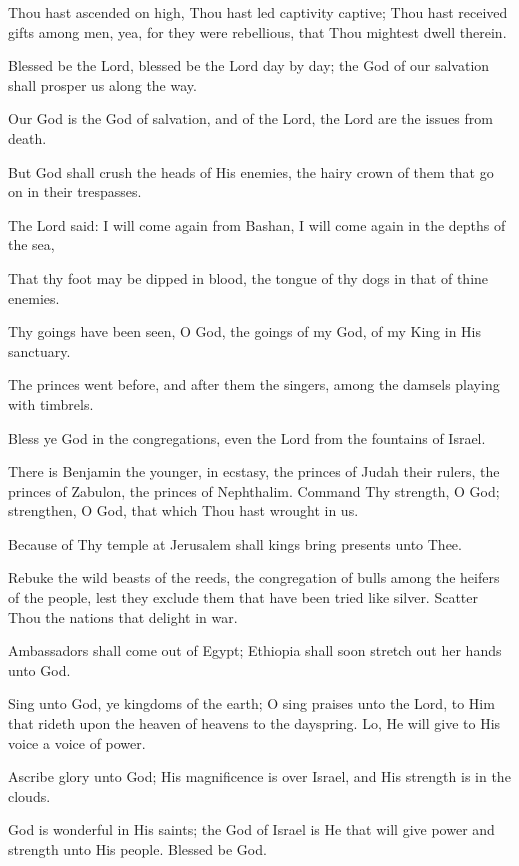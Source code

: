 Thou hast ascended on high, Thou hast led captivity captive; Thou hast received gifts among men, yea, for they were rebellious, that Thou mightest dwell therein.

Blessed be the Lord, blessed be the Lord day by day; the God of our salvation shall prosper us along the way.

Our God is the God of salvation, and of the Lord, the Lord are the issues from death.

But God shall crush the heads of His enemies, the hairy crown of them that go on in their trespasses.

The Lord said: I will come again from Bashan, I will come again in the depths of the sea,

That thy foot may be dipped in blood, the tongue of thy dogs in that of thine enemies.

Thy goings have been seen, O God, the goings of my God, of my King in His sanctuary.

The princes went before, and after them the singers, among the damsels playing with timbrels.

Bless ye God in the congregations, even the Lord from the fountains of Israel.

There is Benjamin the younger, in ecstasy, the princes of Judah their rulers, the princes of Zabulon, the princes of Nephthalim. Command Thy strength, O God; strengthen, O God, that which Thou hast wrought in us.

Because of Thy temple at Jerusalem shall kings bring presents unto Thee.

Rebuke the wild beasts of the reeds, the congregation of bulls among the heifers of the people, lest they exclude them that have been tried like silver. Scatter Thou the nations that delight in war.

Ambassadors shall come out of Egypt; Ethiopia shall soon stretch out her hands unto God.

Sing unto God, ye kingdoms of the earth; O sing praises unto the Lord, to Him that rideth upon the heaven of heavens to the dayspring. Lo, He will give to His voice a voice of power.

Ascribe glory unto God; His magnificence is over Israel, and His strength is in the clouds.

God is wonderful in His saints; the God of Israel is He that will give power and strength unto His people. Blessed be God.
